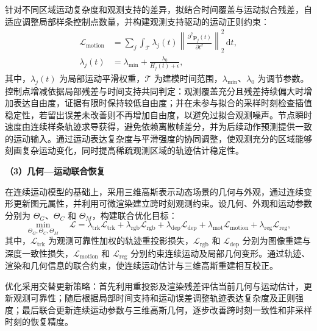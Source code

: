 针对不同区域运动复杂度和观测支持的差异，拟结合时间覆盖与运动拟合残差，自适应调整局部样条控制点数量，并构建观测支持驱动的运动正则约束：
\begin{equation}
  \begin{aligned}
  \mathcal{L}_{\mathrm{motion}}
  &=
  \sum_j\int_{\mathcal{T}}
  \lambda_j(t)
  \left\|
    \frac{\partial^2\mathbf{p}_j(t)}
         {\partial t^2}
  \right\|_2^2\,\mathrm{d}t,\\
  \lambda_j(t)
  &=
  \lambda_{\min}
  +\frac{\lambda_0}{H_j(t)+\epsilon},
  \end{aligned}
  \label{eq:route-motion-adaptive-regularization}
\end{equation}
其中，$\lambda_j(t)$ 为局部运动平滑权重，$\mathcal{T}$ 为建模时间范围，$\lambda_{\min}$、$\lambda_0$ 为调节参数。控制点增减依据局部残差与时间支持共同判定：观测覆盖充分且残差持续偏大时增加表达自由度，证据有限时保持较低自由度；并在未参与拟合的采样时刻检查插值稳定性，若留出误差未改善则不再增加自由度，以避免过拟合观测噪声。节点瞬时速度由连续样条轨迹求导获得，避免依赖离散帧差分，并为后续动作预测提供一致的运动输入。通过运动表达复杂度与平滑强度的协同调整，使观测充分的区域能够刻画复杂运动变化，同时提高稀疏观测区域的轨迹估计稳定性。

\noindent\textbf{（3）几何—运动联合恢复}

在连续运动模型的基础上，采用三维高斯表示动态场景的几何与外观，通过连续变形更新图元属性，并利用可微渲染建立跨时刻观测约束。设几何、外观和运动参数分别为 $\Theta_G$、$\Theta_C$ 和 $\Theta_M$，构建联合优化目标：
\begin{equation}
  \min_{\Theta_G,\Theta_C,\Theta_M}\quad
  \mathcal{L}
  = \lambda_{\mathrm{trk}}\mathcal{L}_{\mathrm{trk}}
  + \lambda_{\mathrm{rgb}}\mathcal{L}_{\mathrm{rgb}}
  + \lambda_{\mathrm{dep}}\mathcal{L}_{\mathrm{dep}}
  + \lambda_{\mathrm{mot}}\mathcal{L}_{\mathrm{motion}}
  + \lambda_{\mathrm{reg}}\mathcal{L}_{\mathrm{reg}},
  \label{eq:route-motion-joint-objective}
\end{equation}
其中，$\mathcal{L}_{\mathrm{trk}}$ 为观测可靠性加权的轨迹重投影损失，$\mathcal{L}_{\mathrm{rgb}}$ 和 $\mathcal{L}_{\mathrm{dep}}$ 分别为图像重建与深度一致性损失，$\mathcal{L}_{\mathrm{motion}}$ 和 $\mathcal{L}_{\mathrm{reg}}$ 分别约束连续运动及局部几何变形。通过轨迹、渲染和几何信息的联合约束，使连续运动估计与三维高斯重建相互校正。

优化采用交替更新策略：首先利用重投影及渲染残差评估当前几何与运动估计，更新观测可靠性；随后根据局部时间支持和运动误差调整轨迹表达复杂度及正则强度；最后联合更新连续运动参数与三维高斯几何，逐步改善跨时刻一致性和非采样时刻的恢复精度。

